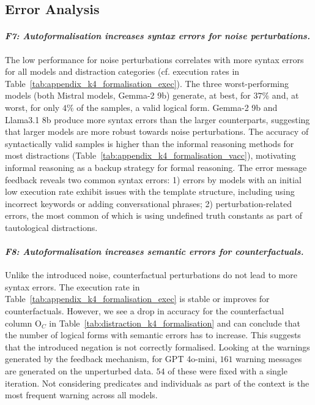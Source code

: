 \subsection{Error Analysis}
\label{subsec:errors}
\paragraph{\textbf{\emph{F7: Autoformalisation increases syntax errors for noise perturbations.}}}
The low performance for noise perturbations correlates with more syntax errors for all models and distraction categories (cf. execution rates in Table~\ref{tab:appendix_k4_formalisation_exec}). The three worst-performing models (both Mistral models, Gemma-2 9b) generate, at best, for $37\%$  and, at worst, for only $4\%$ of the samples, a valid logical form.
Gemma-2 9b and Llama3.1 8b produce more syntax errors than the larger counterparts, suggesting that larger models are more robust towards noise perturbations. 
The accuracy of syntactically valid samples is higher than the informal reasoning methods for most distractions (Table~\ref{tab:appendix_k4_formalisation_vacc}), motivating informal reasoning as a backup strategy for formal reasoning. The error message feedback reveals two common syntax errors: 1) errors by models with an initial low execution rate exhibit issues with the template structure, including using incorrect keywords or adding conversational phrases;
2) perturbation-related errors, the most common of which is using undefined truth constants as part of tautological distractions. 

\paragraph{\textbf{\emph{F8: Autoformalisation increases semantic errors for counterfactuals.}}}
Unlike the introduced noise, counterfactual perturbations do not lead to more syntax errors. The execution rate in Table~\ref{tab:appendix_k4_formalisation_exec} is stable or improves for counterfactuals. However, we see a drop in accuracy for the counterfactual column $\text{O}_C$ in Table~\ref{tab:distraction_k4_formalisation} and can conclude that the number of logical forms with semantic errors has to increase. This suggests that the introduced negation is not correctly formalised. Looking at the warnings generated by the feedback mechanism, for GPT 4o-mini, $161$ warning messages are generated on the unperturbed data. $54$ of these were fixed with a single iteration. Not considering predicates and individuals as part of the context is the most frequent warning across all models. 